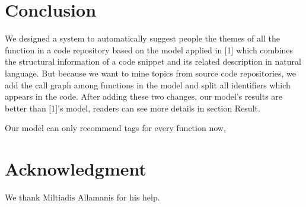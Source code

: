 \documentclass[conference]{IEEEtran}
\begin{document}
%
\IEEEpeerreviewmaketitle










\section{Conclusion}
We designed a system to automatically suggest people the themes of all the function in a code repository based on the model applied in [1] which combines the structural information of a code snippet and its related description in natural language. But because we want to mine topics from source code repositories, we add the call graph among functions in the model and split all identifiers which appears in the code. After adding these two changes, our model's results are better than [1]'s model, readers can see more details in section Result.

Our model can only recommend tags for every function now, 


\section*{Acknowledgment}
We thank Miltiadis Allamanis for his help.



\end{document}
